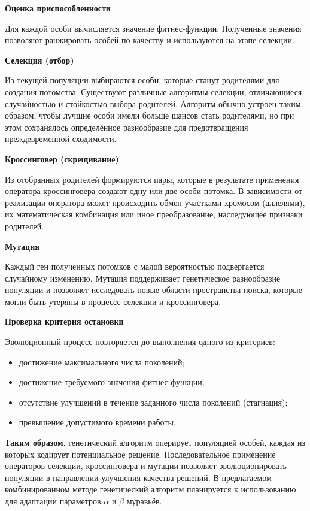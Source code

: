 \textbf{Оценка приспособленности}

Для каждой особи вычисляется значение фитнес-функции. Полученные значения позволяют ранжировать особей по качеству и используются на этапе селекции.

\textbf{Селекция (отбор)}

Из текущей популяции выбираются особи, которые станут родителями для создания потомства.
Существуют различные алгоритмы селекции, отличающиеся случайностью и стойкостью выбора родителей. Алгоритм обычно устроен таким образом, чтобы лучшие особи имели больше шансов стать родителями, но при этом сохранялось определённое разнообразие для предотвращения преждевременной сходимости.

\textbf{Кроссинговер (скрещивание)}

Из отобранных родителей формируются пары, которые в результате применения оператора кроссинговера создают одну или две особи-потомка. В зависимости от реализации оператора может происходить обмен участками хромосом (аллелями), их математическая комбинация или иное преобразование, наследующее признаки родителей.

\textbf{Мутация}

Каждый ген полученных потомков с малой вероятностью подвергается случайному изменению. Мутация поддерживает генетическое разнообразие популяции и позволяет исследовать новые области пространства поиска, которые могли быть утеряны в процессе селекции и кроссинговера.

\textbf{Проверка критерия остановки}

Эволюционный процесс повторяется до выполнения одного из критериев:
\begin{itemize}
	\item достижение максимального числа поколений;
	\item достижение требуемого значения фитнес-функции;
	\item отсутствие улучшений в течение заданного числа поколений (стагнация);
	\item превышение допустимого времени работы.
\end{itemize}

\textbf{Таким образом}, генетический алгоритм оперирует популяцией особей, каждая из которых кодирует потенциальное решение. Последовательное применение операторов селекции, кроссинговера и мутации позволяет эволюционировать популяции в направлении улучшения качества решений. В предлагаемом комбинированном методе генетический алгоритм планируется к использованию для адаптации параметров $\alpha$ и $\beta$ муравьёв.

